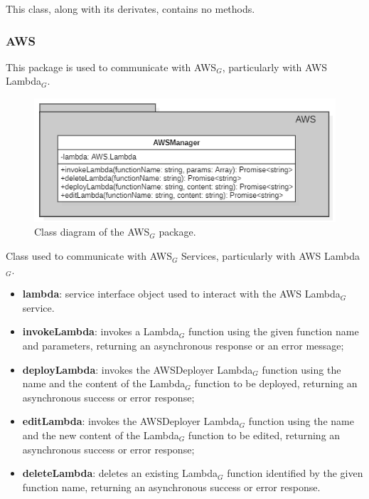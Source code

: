 	This class, along with its derivates, contains no methods.
	\subsubsection{AWS}
	This package is used to communicate with AWS$_{G}$, particularly with AWS Lambda$_{G}$.
	\begin{figure} [h!]
		\centering
		\includegraphics[width=0.8\linewidth]{diagrammi/etherless-server/AWS}
		\caption{Class diagram of the AWS$_{G}$ package.}
	\end{figure}
	Class used to communicate with AWS$_{G}$ Services, particularly with AWS Lambda$_{G}$.
	\begin{itemize}
		\item \textbf{lambda}: service interface object used to interact with the AWS Lambda$_{G}$ service.
	\end{itemize}
	\begin{itemize}
		\item \textbf{invokeLambda}: invokes a Lambda$_{G}$ function using the given function name and parameters, returning an asynchronous response or an error message;
		\item \textbf{deployLambda}: invokes the AWSDeployer Lambda$_{G}$ function using the name and the content of the Lambda$_{G}$ function to be deployed, returning an asynchronous success or error response;
		\item \textbf{editLambda}: invokes the AWSDeployer Lambda$_{G}$ function using the name and the new content of the Lambda$_{G}$ function to be edited, returning an asynchronous success or error response;
		\item \textbf{deleteLambda}: deletes an existing Lambda$_{G}$ function identified by the given function name, returning an asynchronous success or error response.
	\end{itemize}

